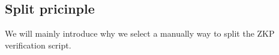 \subsection{Split pricinple} \label{sec:split-pricinple}

We will mainly introduce why we select a manually way to split the ZKP verification script.



